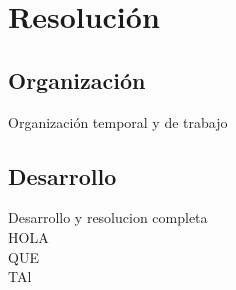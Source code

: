 
\section{Resolución}
\subsection{Organización}
Organización temporal y de trabajo

\subsection{Desarrollo}
Desarrollo y resolucion completa
\\ HOLA
\\ QUE 
\\ TAl
\cite{einstein}
